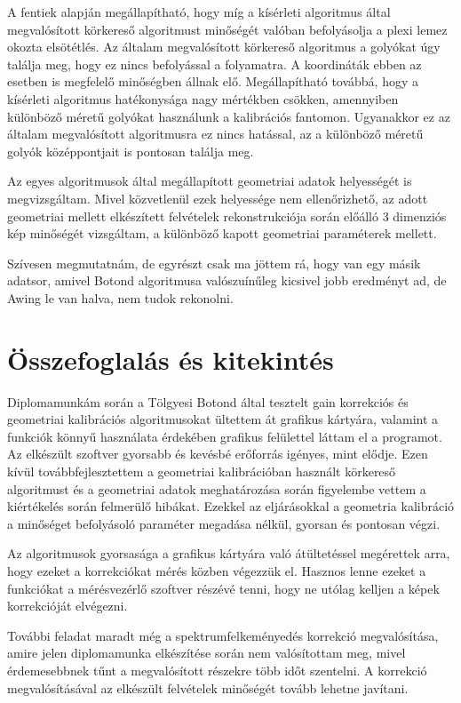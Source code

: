 \documentclass[a4paper,12pt]{article}
\begin{document}
A fentiek alapján megállapítható, hogy míg a kísérleti algoritmus által megvalósított körkereső algoritmust minőségét valóban befolyásolja a plexi lemez okozta elsötétlés. Az általam megvalósított körkereső algoritmus a golyókat úgy találja meg, hogy ez nincs befolyással a folyamatra. A koordináták ebben az esetben is megfelelő minőségben állnak elő. Megállapítható továbbá, hogy a kísérleti algoritmus hatékonysága nagy mértékben csökken, amennyiben különböző méretű golyókat használunk a kalibrációs fantomon. Ugyanakkor ez az általam megvalósított algoritmusra ez nincs hatással, az a különböző méretű golyók középpontjait is pontosan találja meg.



Az egyes algoritmusok által megállapított geometriai adatok helyességét is megvizsgáltam. Mivel közvetlenül ezek helyessége nem ellenőrizhető, az adott geometriai mellett elkészített felvételek rekonstrukciója során előálló 3 dimenziós kép minőségét vizsgáltam, a különböző kapott geometriai paraméterek mellett. 


{ \Huge Szívesen megmutatnám, de egyrészt csak ma jöttem rá, hogy van egy másik adatsor, amivel Botond algoritmusa valószuínűleg kicsivel jobb eredményt ad, de Awing le van halva, nem tudok rekonolni.}


\section{Összefoglalás és kitekintés}


Diplomamunkám során a Tölgyesi Botond által \cite{botond} tesztelt gain korrekciós és geometriai kalibrációs algoritmusokat ültettem át grafikus kártyára, valamint a funkciók könnyű használata érdekében grafikus felülettel láttam el a programot. Az elkészült szoftver gyorsabb és kevésbé erőforrás igényes, mint elődje. Ezen kívül továbbfejlesztettem a geometriai kalibrációban használt körkereső algoritmust és a geometriai adatok meghatározása során figyelembe vettem a kiértékelés során felmerülő hibákat. Ezekkel az eljárásokkal a geometria kalibráció a minőséget befolyásoló paraméter megadása nélkül, gyorsan és pontosan végzi. 


Az algoritmusok gyorsasága a grafikus kártyára való átültetéssel megérettek arra, hogy ezeket a korrekciókat mérés közben végezzük el. Hasznos lenne ezeket a funkciókat a mérésvezérlő szoftver részévé tenni, hogy ne utólag kelljen a képek korrekcióját elvégezni.

További feladat maradt még a spektrumfelkeményedés korrekció megvalósítása, amire jelen diplomamunka elkészítése során nem valósítottam meg, mivel érdemesebbnek tűnt a megvalósított részekre több időt szentelni. A korrekció megvalósításával az elkészült felvételek minőségét tovább lehetne javítani. 
\end{document}

